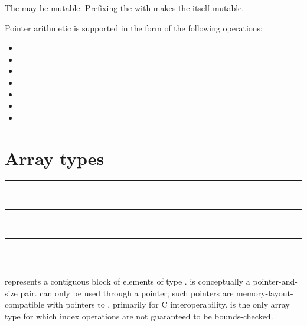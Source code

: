 The  may be mutable. Prefixing the \code{*} with
 makes the  itself mutable.

\begin{samepage}
Pointer arithmetic is supported in the form of the following operations:

\begin{itemize}
\item {} \code{+} 
\item {} \code{+=} 
\item {} \code{++}
\item {} \code{-} 
\item {} \code{-=} 
\item {} \code{--}
\item {} \code{-} 
\end{itemize}
\end{samepage}

\section{Array types}

\begin{grammar}
\rule{array-type-with-constant-size}  \code{[}  \code{]}\\
\rule{array-type-with-runtime-size}  \code{[} \code{]}\\
\rule{array-type-with-unknown-size}  \code{[}  \code{]}\\
\rule{element-type} 
\end{grammar}

 represents a contiguous block of
 elements of type .
 is conceptually a pointer-and-size
pair.  can only be used through a
pointer; such pointers are memory-layout-compatible with pointers to
, primarily for C interoperability.
 is the only array type for which
index operations are not guaranteed to be bounds-checked.

